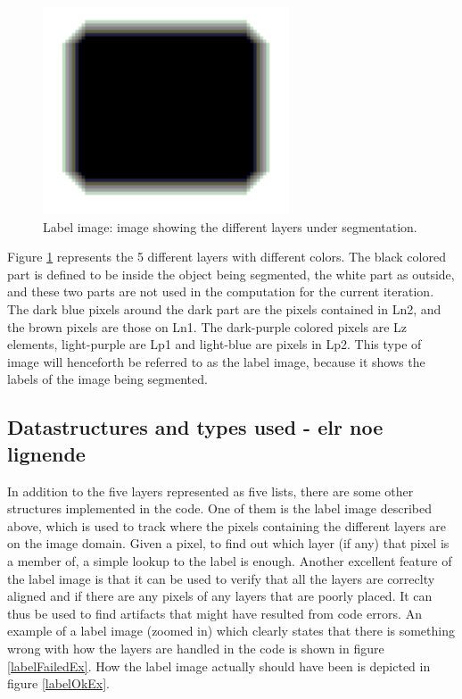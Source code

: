 \begin{figure}[h!]
\centering
\includegraphics[width=0.65\textwidth]{sparseFieldCode/labelExample}
\caption{Label image: image showing the different layers under segmentation.}
\label{labelExample}
\end{figure}

Figure \ref{labelExample} represents the 5 different layers with different colors. The black colored part is defined to be inside the object being segmented, the white part as outside, and these two parts are not used in the computation for the current iteration. The dark blue pixels around the dark part are the pixels contained in Ln2, and the brown pixels are those on Ln1. The dark-purple colored pixels are Lz elements, light-purple are Lp1 and light-blue are pixels in Lp2. This type of image will henceforth be referred to as the label image, because it shows the labels of the image being segmented.

\subsection{Datastructures and types used - elr noe lignende}
In addition to the five layers represented as five lists, there are some other structures implemented in the code. One of them is the label image described above, which is used to track where the pixels containing the different layers are on the image domain. Given a pixel, to find out which layer (if any) that pixel is a member of, a simple lookup to the label is enough. Another excellent feature of the label image is that it can be used to verify that all the layers are correclty aligned and if there are any pixels of any layers that are poorly placed. It can thus be used to find artifacts that might have resulted from code errors. An example of a label image (zoomed in) which clearly states that there is something wrong with how the layers are handled in the code is shown in figure \ref{labelFailedEx}. How the label image actually should have been is depicted in figure \ref{labelOkEx}.

